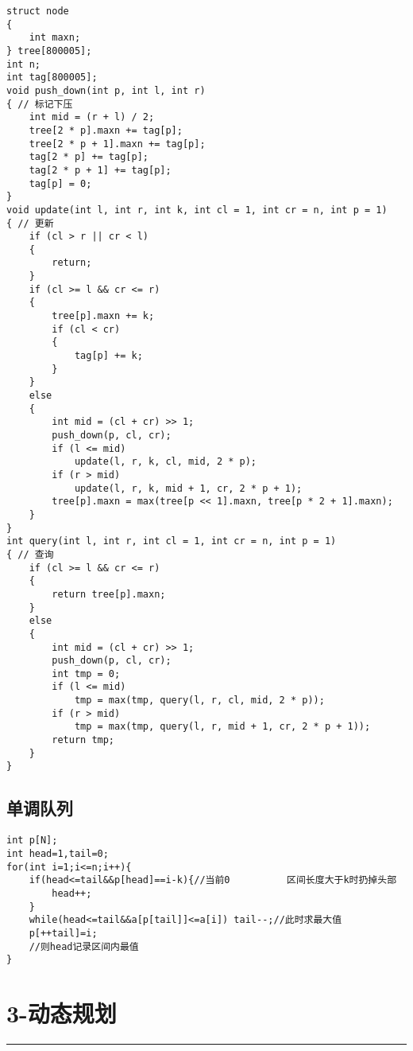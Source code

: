 \documentclass[]{article}
\begin{document}
\begin{verbatim}
struct node
{
    int maxn;
} tree[800005];
int n;
int tag[800005];
void push_down(int p, int l, int r)
{ // 标记下压
    int mid = (r + l) / 2;
    tree[2 * p].maxn += tag[p];
    tree[2 * p + 1].maxn += tag[p];
    tag[2 * p] += tag[p];
    tag[2 * p + 1] += tag[p];
    tag[p] = 0;
}
void update(int l, int r, int k, int cl = 1, int cr = n, int p = 1)
{ // 更新
    if (cl > r || cr < l)
    {
        return;
    }
    if (cl >= l && cr <= r)
    {
        tree[p].maxn += k;
        if (cl < cr)
        {
            tag[p] += k;
        }
    }
    else
    {
        int mid = (cl + cr) >> 1;
        push_down(p, cl, cr);
        if (l <= mid)
            update(l, r, k, cl, mid, 2 * p);
        if (r > mid)
            update(l, r, k, mid + 1, cr, 2 * p + 1);
        tree[p].maxn = max(tree[p << 1].maxn, tree[p * 2 + 1].maxn);
    }
}
int query(int l, int r, int cl = 1, int cr = n, int p = 1)
{ // 查询
    if (cl >= l && cr <= r)
    {
        return tree[p].maxn;
    }
    else
    {
        int mid = (cl + cr) >> 1;
        push_down(p, cl, cr);
        int tmp = 0;
        if (l <= mid)
            tmp = max(tmp, query(l, r, cl, mid, 2 * p));
        if (r > mid)
            tmp = max(tmp, query(l, r, mid + 1, cr, 2 * p + 1));
        return tmp;
    }
}
\end{verbatim}

\hypertarget{ux5355ux8c03ux961fux5217}{%
\subsection{单调队列}\label{ux5355ux8c03ux961fux5217}}

\begin{verbatim}
int p[N];
int head=1,tail=0;
for(int i=1;i<=n;i++){
    if(head<=tail&&p[head]==i-k){//当前0          区间长度大于k时扔掉头部
        head++;
    }
    while(head<=tail&&a[p[tail]]<=a[i]) tail--;//此时求最大值
    p[++tail]=i;
    //则head记录区间内最值
}
\end{verbatim}

\hypertarget{ux52a8ux6001ux89c4ux5212}{%
\section{3-动态规划}\label{ux52a8ux6001ux89c4ux5212}}

\begin{center}\rule{0.5\linewidth}{0.5pt}\end{center}
\end{document}
